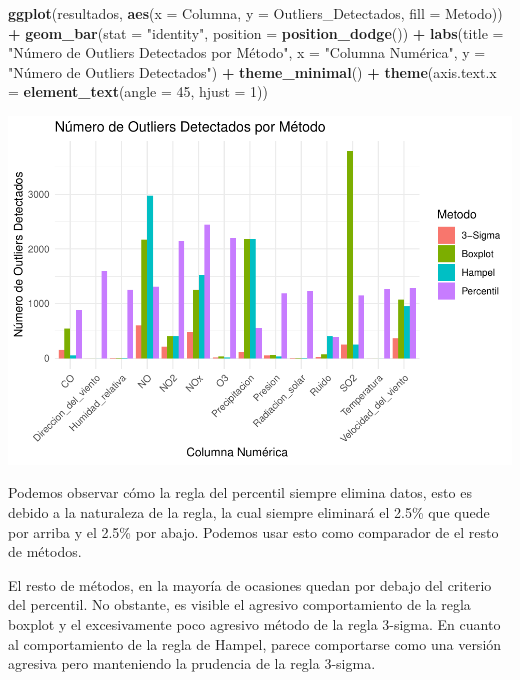 \documentclass[notspecified,article,submit,moreauthors,pdftex]{Definitions/mdpi}
\newenvironment{Shaded}{\begin{snugshade}}{\end{snugshade}}
\newcommand{\AttributeTok}[1]{\textcolor[rgb]{0.13,0.29,0.53}{#1}}
\newcommand{\DecValTok}[1]{\textcolor[rgb]{0.00,0.00,0.81}{#1}}
\newcommand{\FunctionTok}[1]{\textcolor[rgb]{0.13,0.29,0.53}{\textbf{#1}}}
\newcommand{\NormalTok}[1]{#1}
\newcommand{\SpecialCharTok}[1]{\textcolor[rgb]{0.81,0.36,0.00}{\textbf{#1}}}
\newcommand{\StringTok}[1]{\textcolor[rgb]{0.31,0.60,0.02}{#1}}
\begin{document}
\begin{Shaded}
\begin{Highlighting}[]
\FunctionTok{ggplot}\NormalTok{(resultados, }\FunctionTok{aes}\NormalTok{(}\AttributeTok{x =}\NormalTok{ Columna, }\AttributeTok{y =}\NormalTok{ Outliers\_Detectados, }\AttributeTok{fill =}\NormalTok{ Metodo)) }\SpecialCharTok{+}
  \FunctionTok{geom\_bar}\NormalTok{(}\AttributeTok{stat =} \StringTok{"identity"}\NormalTok{, }\AttributeTok{position =} \FunctionTok{position\_dodge}\NormalTok{()) }\SpecialCharTok{+}
  \FunctionTok{labs}\NormalTok{(}\AttributeTok{title =} \StringTok{"Número de Outliers Detectados por Método"}\NormalTok{,}
       \AttributeTok{x =} \StringTok{"Columna Numérica"}\NormalTok{,}
       \AttributeTok{y =} \StringTok{"Número de Outliers Detectados"}\NormalTok{) }\SpecialCharTok{+}
  \FunctionTok{theme\_minimal}\NormalTok{() }\SpecialCharTok{+}
  \FunctionTok{theme}\NormalTok{(}\AttributeTok{axis.text.x =} \FunctionTok{element\_text}\NormalTok{(}\AttributeTok{angle =} \DecValTok{45}\NormalTok{, }\AttributeTok{hjust =} \DecValTok{1}\NormalTok{))}
\end{Highlighting}
\end{Shaded}

\includegraphics{ProyectoAED2023_plantilla_files/figure-latex/unnamed-chunk-17-1.pdf}

Podemos observar cómo la regla del percentil siempre elimina datos, esto
es debido a la naturaleza de la regla, la cual siempre eliminará el
2.5\% que quede por arriba y el 2.5\% por abajo. Podemos usar esto como
comparador de el resto de métodos.

El resto de métodos, en la mayoría de ocasiones quedan por debajo del
criterio del percentil. No obstante, es visible el agresivo
comportamiento de la regla boxplot y el excesivamente poco agresivo
método de la regla 3-sigma. En cuanto al comportamiento de la regla de
Hampel, parece comportarse como una versión agresiva pero manteniendo la
prudencia de la regla 3-sigma.
\end{document}
